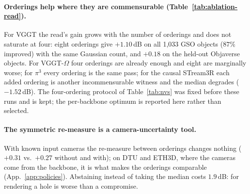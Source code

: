 \paragraph{Orderings help where they are commensurable (Table~\ref{tab:ablation-read}).}
For VGGT the read's gain grows with the number of orderings and does not saturate at four: eight orderings give
${+}1.10$\,dB on all 1{,}033 GSO objects ($87\%$ improved) with the same Gaussian count, and ${+}0.18$ on the held-out
Objaverse objects. For VGGT-$\Omega$ four orderings are already enough and eight are marginally worse; for $\pi^3$ every
ordering is the same pass; for the causal STream3R each added ordering is another incommensurable witness and the median
degrades ($-1.52$\,dB). The four-ordering protocol of Table~\ref{tab:nvs} was fixed before these runs and is kept; the
per-backbone optimum is reported here rather than selected.

\paragraph{The symmetric re-measure is a camera-uncertainty tool.}
With known input cameras the re-measure between orderings changes nothing (${+}0.31$ vs.\ ${+}0.27$ without and with);
on DTU and ETH3D, where the cameras come from the backbone, it is what makes the orderings comparable
(App.~\ref{app:policies}). Abstaining instead of taking the median costs $1.9$\,dB: for rendering a hole is worse than a
compromise.

